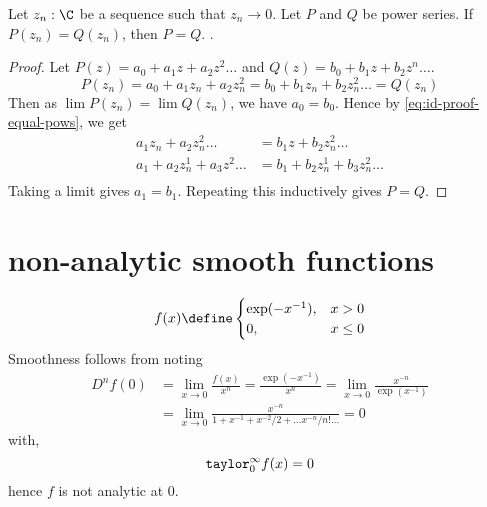 \documentclass[10pt]{scrartcl}
\begin{document}
\begin{theorem}
  Let $z_n:\C$ be a sequence such that $z_n\to 0$. Let $P$ and $Q$ be power series. If $P(z_n)=Q(z_n)$, then $P=Q$. 
  \cite{needham:visual-complex}. 
\end{theorem}
\begin{proof}
  Let $P(z)=a_0+a_1z+a_2z^2\dots$ and $Q(z)=b_0+b_1z+b_2z^n\dots$.
  \begin{equation}
    \label{eq:id-proof-equal-pows}
    P(z_n)=a_0+a_1z_n+a_2z_n^2=b_0+b_1z_n+b_2z_n^2\dots = Q(z_n)
  \end{equation}
  Then as $\lim P(z_n)=\lim Q(z_n)$, we have $a_0=b_0$. Hence by \cref{eq:id-proof-equal-pows}, we get
  \begin{align*}
    a_1z_n+a_2z_n^2\dots &= b_1z+b_2z_n^2\dots\\
    a_1+a_2z_n^1+a_3z^2\dots &= b_1+b_2z_n^1+b_3z_n^2\dots\\
  \end{align*}
  Taking a limit gives $a_1=b_1$. Repeating this inductively gives $P=Q$. 
\end{proof}

\section{non-analytic smooth functions}
\begin{counterex}
  \[
  f(x)\define
  \begin{cases}
    \exp(-x^{-1}),&x>0\\
    0,&x\leq 0
  \end{cases}
  \]
  Smoothness follows from noting
  \begin{align*}
    D^nf(0)&=\lim_{x\to 0}\frac{f(x)}{x^n}=\frac{\exp(-x^{-1})}{x^n}=\lim_{x\to 0}\frac{x^{-n}}{\exp(x^{-1})}\\
           &=\lim_{x\to 0}\frac{x^{-n}}{1+x^{-1}+x^{-2}/2+\dots x^{-n}/n!\dots}=0
  \end{align*}
  with, 
  \[
  \mathtt{taylor}_0^\infty f(x)=0
  \]
  hence $f$ is not analytic at $0$. 
  \cite{wiki:smooth-non-analytic}
\end{counterex}


\printbibliography
\end{document}

